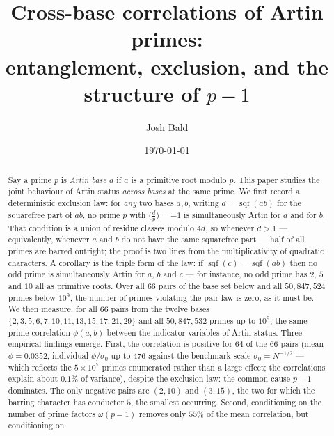 \documentclass[11pt,reqno]{amsart}
\theoremstyle{plain}
\theoremstyle{definition}
\DeclareMathOperator{\sqf}{sqf}
\begin{document}
\title[Cross-base correlations of Artin primes]
{Cross-base correlations of Artin primes:\\ entanglement, exclusion, and the
structure of $p-1$}

\author{Josh Bald}
\address{Ontario, Canada}


\date{\today}

\begin{abstract}
Say a prime $p$ is \emph{Artin base $a$} if $a$ is a primitive root modulo
$p$. This paper studies the joint behaviour of Artin status \emph{across
bases} at the same prime. We first record a deterministic exclusion law: for
\emph{any} two bases $a, b$, writing $d = \sqf(ab)$ for the squarefree part of
$ab$, no prime $p$ with $\bigl(\tfrac{d}{p}\bigr) = -1$ is simultaneously
Artin for $a$ and for $b$. That condition is a union of residue classes
modulo $4d$, so whenever $d > 1$ --- equivalently, whenever $a$ and $b$ do not
have the same squarefree part --- half of all primes are barred outright;
the proof is two lines from the multiplicativity of quadratic characters. A
corollary is the triple form of the law: if $\sqf(c) = \sqf(ab)$ then no odd
prime is simultaneously Artin for $a$, $b$ and $c$ --- for instance, no odd
prime has $2$, $5$ and $10$ all as primitive roots. Over all $66$ pairs of the base set
below and all $50{,}847{,}524$ primes below $10^9$, the number of primes
violating the pair law is zero, as it must be.
We then measure, for all $66$ pairs from the twelve bases
$\{2,3,5,6,7,10,11,13,15,17,21,29\}$ and all $50{,}847{,}532$ primes up to
$10^9$, the same-prime correlation $\phi(a,b)$ between the indicator variables
of Artin status. Three empirical findings emerge. First, the correlation is
positive for $64$ of the $66$ pairs (mean $\phi = 0.0352$, individual $\phi/\sigma_0$ up to $476$ against the benchmark scale $\sigma_0 = N^{-1/2}$ --- which reflects the $5 \times 10^7$ primes enumerated rather than a large effect; the correlations explain about $0.1\%$ of variance),
despite the exclusion law: the common cause $p-1$ dominates. The only negative
pairs are $(2,10)$ and $(3,15)$, the two for which the barring character has
conductor $5$, the smallest occurring. Second, conditioning on the number of prime factors
$\omega(p-1)$ removes only $55\%$ of the mean correlation, but conditioning on

\end{abstract}
\end{document}
